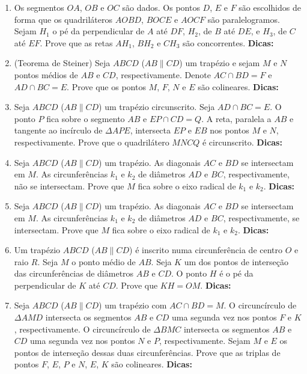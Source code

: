 \documentclass{article}
\newcommand{\dica}{\textbf{Dicas:}}
\begin{document}
\begin{multicols}{2}
\begin{enumerate}
    \item Os segmentos $OA$, $OB$ e $OC$ são dados. Os pontos $D$, $E$ e $F$ são escolhidos de forma que os quadriláteros $AOBD$, $BOCE$ e $AOCF$ são paralelogramos. Sejam $H_1$ o pé da perpendicular de $A$ até $DF$, $H_2$, de $B$ até $DE$, e $H_3$, de $C$ até $EF$. Prove que as retas $AH_1$, $BH_2$ e $CH_3$ são concorrentes. \dica %
    
    \item (Teorema de Steiner) Seja $ABCD$ ($AB\parallel CD$) um trapézio e sejam $M$ e $N$ pontos médios de $AB$ e $CD$, respectivamente. Denote $AC\cap BD=F$ e $AD\cap BC=E$. Prove que os pontos $M$, $F$, $N$ e $E$ são colineares. \dica %
    
    \item Seja $ABCD$ ($AB\parallel CD$) um trapézio circunscrito. Seja $AD\cap BC=E$. O ponto $P$ fica sobre o segmento $AB$ e $EP\cap CD=Q$. A reta, paralela a $AB$ e tangente ao incírculo de $\Delta APE$, intersecta $EP$ e $EB$ nos pontos $M$ e $N$, respectivamente. Prove que o quadrilátero $MNCQ$ é circunscrito. \dica %
    
    \item Seja $ABCD$ ($AB\parallel CD$) um trapézio. As diagonais $AC$ e $BD$ se intersectam em $M$. As circunferências $k_1$ e $k_2$ de diâmetros $AD$ e $BC$, respectivamente, não se intersectam. Prove que $M$ fica sobre o eixo radical de $k_1$ e $k_2$. \dica %
    
    \item Seja $ABCD$ ($AB\parallel CD$) um trapézio. As diagonais $AC$ e $BD$ se intersectam em $M$. As circunferências $k_1$ e $k_2$ de diâmetros $AD$ e $BC$, respectivamente, se intersectam. Prove que $M$ fica sobre o eixo radical de $k_1$ e $k_2$. \dica %
    
    \item Um trapézio $ABCD$ ($AB\parallel CD$) é inscrito numa circunferência de centro $O$ e raio $R$. Seja $M$ o ponto médio de $AB$. Seja $K$ um dos pontos de interseção das circunferências de diâmetros $AB$ e $CD$. O ponto $H$ é o pé da perpendicular de $K$ até $CD$. Prove que $KH=OM$. \dica %
    
    \item Seja $ABCD$ ($AB\parallel CD$) um trapézio com $AC\cap BD=M$. O circuncírculo de $\Delta AMD$ intersecta os segmentos $AB$ e $CD$ uma segunda vez nos pontos $F$ e $K$, respectivamente. O circuncírculo de $\Delta BMC$ intersecta os segmentos $AB$ e $CD$ uma segunda vez nos pontos $N$ e $P$, respectivamente. Sejam $M$ e $E$ os pontos de interseção dessas duas circunferências. Prove que as triplas de pontos $F$, $E$, $P$ e $N$, $E$, $K$ são colineares. \dica %
    

\end{enumerate}
\end{multicols}
\end{document}
